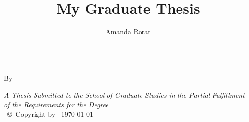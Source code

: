 \documentclass[
11pt, %
oneside, %
english, %
singlespacing, %
]{macthesis} %
\title{My Graduate Thesis}
\author{Amanda Rorat}
\date{}
\def\blankpage{%
      \clearpage%
      \thispagestyle{empty}%
      \addtocounter{page}{-1}%
      \null%
      \clearpage}
\begin{document}
\sloppy

\frontmatter %

\pagestyle{plain} %

\vspace{6cm}
\begin{center}
\ttitle
\end{center}
\clearpage

\begin{center}

\vfill
\textsc{\Large \ttitle} \\

\vfill
{By \authorname\, \bdeg }


 \vfill
{\large \textit{A Thesis Submitted to the School of Graduate Studies in the Partial Fulfillment of the Requirements for the Degree \degreename}}\\

\vfill
{\large \univname\, \copyright\, Copyright by \authorname\, \today}\\[4cm] %

\end{center}
\blankpage
\clearpage


\vspace*{0.2\textheight}

\bigbreak
\end{document}
